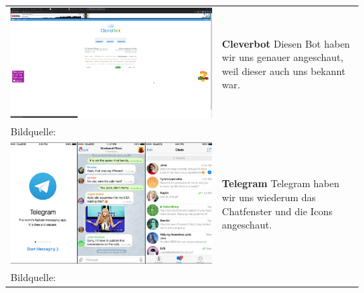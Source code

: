 \begin{tabular}{C{6cm}  L{7cm}}
    \includegraphics[width=\linewidth]{bilder/research pic/cleverbot.png}                 & \textbf{Cleverbot} \newline
    Diesen Bot haben wir uns genauer angeschaut, weil dieser auch uns bekannt war.                                      \\
    Bildquelle:\cite{cleverbot} \newline
    \\
    \includegraphics[width=\linewidth]{bilder/research pic/Telegram pic.png}              & \textbf{Telegram} \newline
    Telegram haben wir uns wiederum das Chatfenster und die Icons angeschaut.                                          \\
    Bildquelle:\cite{telegrambild} \newline
    \\

\end{tabular}
